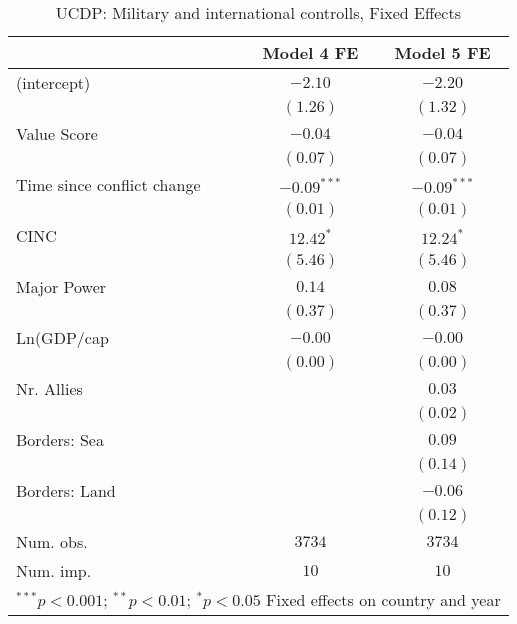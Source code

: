 
\begin{table}
\begin{center}
\begin{tabular}{l c c}
\toprule
 & Model 4 FE & Model 5 FE \\
\midrule
(intercept)                & $-2.10$       & $-2.20$       \\
                           & $(1.26)$      & $(1.32)$      \\
Value Score                & $-0.04$       & $-0.04$       \\
                           & $(0.07)$      & $(0.07)$      \\
Time since conflict change & $-0.09^{***}$ & $-0.09^{***}$ \\
                           & $(0.01)$      & $(0.01)$      \\
CINC                       & $12.42^{*}$   & $12.24^{*}$   \\
                           & $(5.46)$      & $(5.46)$      \\
Major Power                & $0.14$        & $0.08$        \\
                           & $(0.37)$      & $(0.37)$      \\
Ln(GDP/cap                 & $-0.00$       & $-0.00$       \\
                           & $(0.00)$      & $(0.00)$      \\
Nr. Allies                 &               & $0.03$        \\
                           &               & $(0.02)$      \\
Borders: Sea               &               & $0.09$        \\
                           &               & $(0.14)$      \\
Borders: Land              &               & $-0.06$       \\
                           &               & $(0.12)$      \\
\midrule
Num. obs.                  & $3734$        & $3734$        \\
Num. imp.                  & $10$          & $10$          \\
\bottomrule
\multicolumn{3}{l}{\scriptsize{$^{***}p<0.001$; $^{**}p<0.01$; $^{*}p<0.05$ 
 Fixed effects on country and year}}
\end{tabular}
\caption{UCDP: Military and international controlls, Fixed Effects}
\label{UCDP_2_FE}
\end{center}
\end{table}
